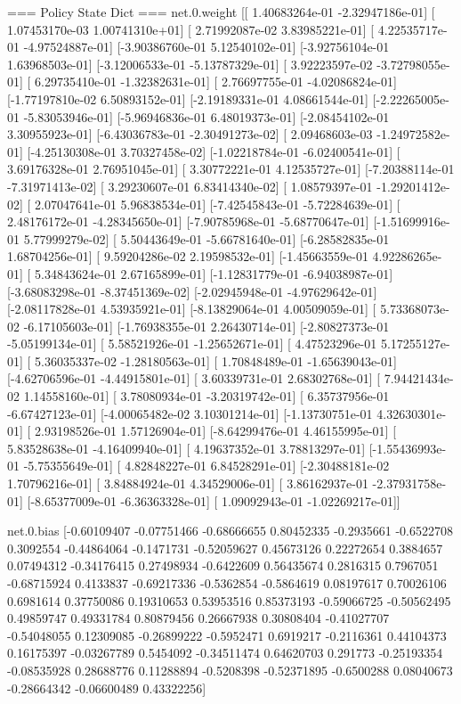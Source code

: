 === Policy State Dict ===
net.0.weight [[ 1.40683264e-01 -2.32947186e-01]
 [ 1.07453170e-03  1.00741310e+01]
 [ 2.71992087e-02  3.83985221e-01]
 [ 4.22535717e-01 -4.97524887e-01]
 [-3.90386760e-01  5.12540102e-01]
 [-3.92756104e-01  1.63968503e-01]
 [-3.12006533e-01 -5.13787329e-01]
 [ 3.92223597e-02 -3.72798055e-01]
 [ 6.29735410e-01 -1.32382631e-01]
 [ 2.76697755e-01 -4.02086824e-01]
 [-1.77197810e-02  6.50893152e-01]
 [-2.19189331e-01  4.08661544e-01]
 [-2.22265005e-01 -5.83053946e-01]
 [-5.96946836e-01  6.48019373e-01]
 [-2.08454102e-01  3.30955923e-01]
 [-6.43036783e-01 -2.30491273e-02]
 [ 2.09468603e-03 -1.24972582e-01]
 [-4.25130308e-01  3.70327458e-02]
 [-1.02218784e-01 -6.02400541e-01]
 [ 3.69176328e-01  2.76951045e-01]
 [ 3.30772221e-01  4.12535727e-01]
 [-7.20388114e-01 -7.31971413e-02]
 [ 3.29230607e-01  6.83414340e-02]
 [ 1.08579397e-01 -1.29201412e-02]
 [ 2.07047641e-01  5.96838534e-01]
 [-7.42545843e-01 -5.72284639e-01]
 [ 2.48176172e-01 -4.28345650e-01]
 [-7.90785968e-01 -5.68770647e-01]
 [-1.51699916e-01  5.77999279e-02]
 [ 5.50443649e-01 -5.66781640e-01]
 [-6.28582835e-01  1.68704256e-01]
 [ 9.59204286e-02  2.19598532e-01]
 [-1.45663559e-01  4.92286265e-01]
 [ 5.34843624e-01  2.67165899e-01]
 [-1.12831779e-01 -6.94038987e-01]
 [-3.68083298e-01 -8.37451369e-02]
 [-2.02945948e-01 -4.97629642e-01]
 [-2.08117828e-01  4.53935921e-01]
 [-8.13829064e-01  4.00509059e-01]
 [ 5.73368073e-02 -6.17105603e-01]
 [-1.76938355e-01  2.26430714e-01]
 [-2.80827373e-01 -5.05199134e-01]
 [ 5.58521926e-01 -1.25652671e-01]
 [ 4.47523296e-01  5.17255127e-01]
 [ 5.36035337e-02 -1.28180563e-01]
 [ 1.70848489e-01 -1.65639043e-01]
 [-4.62706596e-01 -4.44915801e-01]
 [ 3.60339731e-01  2.68302768e-01]
 [ 7.94421434e-02  1.14558160e-01]
 [ 3.78080934e-01 -3.20319742e-01]
 [ 6.35737956e-01 -6.67427123e-01]
 [-4.00065482e-02  3.10301214e-01]
 [-1.13730751e-01  4.32630301e-01]
 [ 2.93198526e-01  1.57126904e-01]
 [-8.64299476e-01  4.46155995e-01]
 [ 5.83528638e-01 -4.16409940e-01]
 [ 4.19637352e-01  3.78813297e-01]
 [-1.55436993e-01 -5.75355649e-01]
 [ 4.82848227e-01  6.84528291e-01]
 [-2.30488181e-02  1.70796216e-01]
 [ 3.84884924e-01  4.34529006e-01]
 [ 3.86162937e-01 -2.37931758e-01]
 [-8.65377009e-01 -6.36363328e-01]
 [ 1.09092943e-01 -1.02269217e-01]] 

net.0.bias [-0.60109407 -0.07751466 -0.68666655  0.80452335 -0.2935661  -0.6522708
  0.3092554  -0.44864064 -0.1471731  -0.52059627  0.45673126  0.22272654
  0.3884657   0.07494312 -0.34176415  0.27498934 -0.6422609   0.56435674
  0.2816315   0.7967051  -0.68715924  0.4133837  -0.69217336 -0.5362854
 -0.5864619   0.08197617  0.70026106  0.6981614   0.37750086  0.19310653
  0.53953516  0.85373193 -0.59066725 -0.50562495  0.49859747  0.49331784
  0.80879456  0.26667938  0.30808404 -0.41027707 -0.54048055  0.12309085
 -0.26899222 -0.5952471   0.6919217  -0.2116361   0.44104373  0.16175397
 -0.03267789  0.5454092  -0.34511474  0.64620703  0.291773   -0.25193354
 -0.08535928  0.28688776  0.11288894 -0.5208398  -0.52371895 -0.6500288
  0.08040673 -0.28664342 -0.06600489  0.43322256] 

